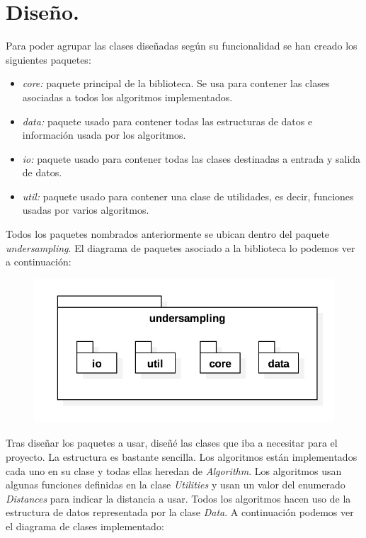 \section{Diseño.} \label{sec:disenio}

Para poder agrupar las clases diseñadas según su funcionalidad se han creado los siguientes paquetes: 

\begin{itemize}
	\item \textit{core:} paquete principal de la biblioteca. Se usa para contener las clases asociadas a todos los algoritmos implementados.
	\item \textit{data:} paquete usado para contener todas las estructuras de datos e información usada por los algoritmos.
	\item \textit{io:} paquete usado para contener todas las clases destinadas a entrada y salida de datos.
	\item \textit{util:} paquete usado para contener una clase de utilidades, es decir, funciones usadas por varios algoritmos.
\end{itemize}

Todos los paquetes nombrados anteriormente se ubican dentro del paquete \textit{undersampling}. El diagrama de paquetes asociado a la biblioteca lo podemos ver a continuación:

\begin{figure}[H]
\includegraphics[width=0.80\linewidth]{./imagenes/3_paquetes.jpg}
\end{figure}

Tras diseñar los paquetes a usar, diseñé las clases que iba a necesitar para el proyecto. La estructura es bastante sencilla. Los algoritmos están implementados cada uno en su clase y todas ellas heredan de \textit{Algorithm}. Los algoritmos usan algunas funciones definidas en la clase \textit{Utilities} y usan un valor del enumerado \textit{Distances} para indicar la distancia a usar. Todos los algoritmos hacen uso de la estructura de datos representada por la clase \textit{Data}. A continuación podemos ver el diagrama de clases implementado:

